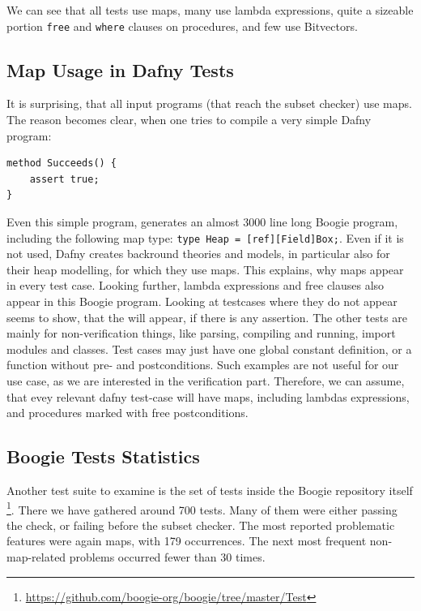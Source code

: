 We can see that all tests use maps, many use lambda expressions,
quite a sizeable portion \lstinline[columns=fixed]{free} and
\lstinline[columns=fixed]{where} clauses on procedures,
and few use Bitvectors.


\subsection{Map Usage in Dafny Tests}

It is surprising, that all input programs (that reach the subset checker) use maps.
The reason becomes clear, when one tries to compile a very simple Dafny program:

\begin{lstlisting}[caption={Simple Dafny Program}]
method Succeeds() {
    assert true;
}
\end{lstlisting}

Even this simple program, generates an almost 3000 line long Boogie program, including the following map type:
\lstinline[columns=fixed]{type Heap = [ref][Field]Box;}.
Even if it is not used, Dafny creates backround theories and models,
in particular also for their heap modelling, for which they use maps.
This explains, why maps appear in every test case.
Looking further, lambda expressions and free clauses also appear in this Boogie program.
Looking at testcases where they do not appear seems to show, that the will appear,
if there is any assertion.
The other tests are mainly for non-verification things, like parsing, compiling and running,
import modules and classes.
Test cases may just have one global constant definition, or a function without pre- and postconditions.
Such examples are not useful for our use case, as we are interested in the verification part.
Therefore, we can assume, that evey relevant dafny test-case will have maps, including lambdas expressions,
and procedures marked with free postconditions.


\subsection{Boogie Tests Statistics}

Another test suite to examine is the set of tests inside the Boogie repository itself
\footnote{\url{https://github.com/boogie-org/boogie/tree/master/Test}}.
There we have gathered around 700 tests.
Many of them were either passing the check,
or failing before the subset checker.
The most reported problematic features were again maps,
with 179 occurrences.
The next most frequent non-map-related problems occurred fewer than 30 times.


